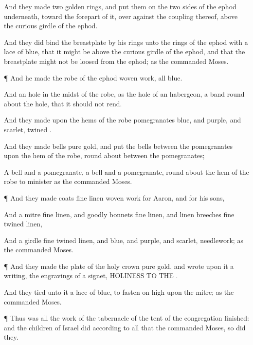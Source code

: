 {And they
made
two
{}
golden
rings, and
put them on the
two
sides of the
ephod
underneath,
toward the
forepart of it, over
against the
{}
coupling thereof,
above the curious
girdle of the
ephod.

And they did
bind the
breastplate by his
rings unto the
rings of the
ephod with a
lace of
blue, that it might be above the curious
girdle of the
ephod, and that the
breastplate might not be
loosed from the
ephod; as the
{}
commanded
Moses.


\par }{\PP {}¶ And he
made the
robe of the
ephod
{}
woven
work,
all
{}
blue.

And
{} an
hole in the
midst of the
robe, as the
hole of an
habergeon,
{} a
band round
about the
hole, that it should not
rend.

And they
made upon the
hems of the
robe
pomegranates
{}
blue, and
purple, and
scarlet,
{}
twined
{}.

And they
made
bells
{}
pure
gold, and
put the
bells
between the
pomegranates upon the
hem of the
robe, round
about
between the
pomegranates;

A
bell and a
pomegranate, a
bell and a
pomegranate, round
about the
hem of the
robe to
minister
{} as the
{}
commanded
Moses.


\par }{\PP {}¶ And they
made
coats
{} fine
linen
{}
woven
work for
Aaron, and for his
sons,

And a
mitre
{} fine
linen, and
goodly
bonnets
{} fine
linen, and
linen
breeches
{} fine
twined
linen,

And a
girdle
{} fine
twined
linen, and
blue, and
purple, and
scarlet,
{}
needlework; as the
{}
commanded
Moses.


\par }{\PP {}¶ And they
made the
plate of the
holy
crown
{}
pure
gold, and
wrote upon it a
writing,
{} the
engravings of a
signet,
HOLINESS TO THE
{}.

And they
tied unto it a
lace of
blue, to
fasten
{} on
high upon the
mitre; as the
{}
commanded
Moses.


\par }{\PP {}¶ Thus was all the
work of the
tabernacle of the
tent of the
congregation
finished: and the
children of
Israel
did according to all that the
{}
commanded
Moses, so
did they.


}
